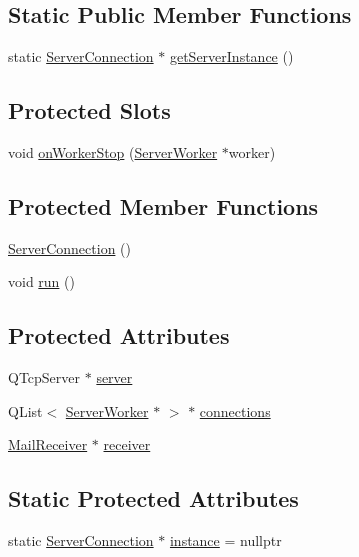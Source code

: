\subsection*{Static Public Member Functions}
\begin{DoxyCompactItemize}
\item 
static \hyperlink{a00238}{Server\+Connection} $\ast$ \hyperlink{a00238_ad64d541093e285a983911f22ab9a0bff}{get\+Server\+Instance} ()
\end{DoxyCompactItemize}
\subsection*{Protected Slots}
\begin{DoxyCompactItemize}
\item 
void \hyperlink{a00238_af558fe509b60eb019281316513f6d188}{on\+Worker\+Stop} (\hyperlink{a00242}{Server\+Worker} $\ast$worker)
\end{DoxyCompactItemize}
\subsection*{Protected Member Functions}
\begin{DoxyCompactItemize}
\item 
\hyperlink{a00238_a0adf644e7715ddbb83a53651b0804dec}{Server\+Connection} ()
\item 
void \hyperlink{a00238_ac7f219a30789e91afa079ab5e49529bd}{run} ()
\end{DoxyCompactItemize}
\subsection*{Protected Attributes}
\begin{DoxyCompactItemize}
\item 
Q\+Tcp\+Server $\ast$ \hyperlink{a00238_aee9a8e6c0f1d25fc2fcb4662631c0c74}{server}
\item 
Q\+List$<$ \hyperlink{a00242}{Server\+Worker} $\ast$ $>$ $\ast$ \hyperlink{a00238_a7d9e1b1ac7c2d57b439ab5918e7c31d0}{connections}
\item 
\hyperlink{a00154}{Mail\+Receiver} $\ast$ \hyperlink{a00162_aa57ce2f74f8ad76abb38974f85b97ac5}{receiver}
\end{DoxyCompactItemize}
\subsection*{Static Protected Attributes}
\begin{DoxyCompactItemize}
\item 
static \hyperlink{a00238}{Server\+Connection} $\ast$ \hyperlink{a00238_adbbe8ffe6ee71b0aee4db9b6e689ba2a}{instance} = nullptr
\end{DoxyCompactItemize}


